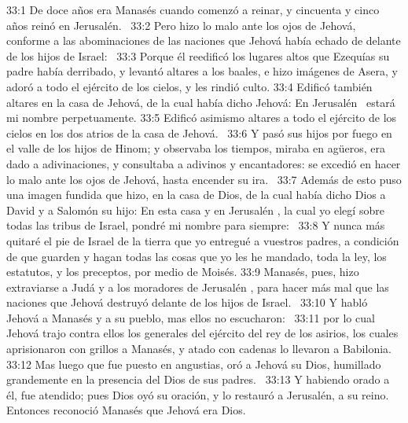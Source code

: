																																	
																																	33:1 De doce años era Manasés cuando comenzó a reinar, y cincuenta y cinco años reinó en Jerusalén.  
																																	33:2 Pero hizo lo malo ante los ojos de Jehová, conforme a las abominaciones de las naciones que Jehová había echado de delante de los hijos de Israel:  
																																	33:3 Porque él reedificó los lugares altos que Ezequías su padre había derribado, y levantó altares a los baales, e hizo imágenes de Asera, y adoró a todo el ejército de los cielos, y les rindió culto. 
																																	33:4 Edificó también altares en la casa de Jehová, de la cual había dicho Jehová: En Jerusalén  estará mi nombre perpetuamente. 
																																	33:5 Edificó asimismo altares a todo el ejército de los cielos en los dos atrios de la casa de Jehová.  
																																	33:6 Y pasó sus hijos por fuego en el valle de los hijos de Hinom; y observaba los tiempos, miraba en agüeros, era dado a adivinaciones, y consultaba a adivinos y encantadores: se excedió en hacer lo malo ante los ojos de Jehová, hasta encender su ira.  
																																	33:7 Además de esto puso una imagen fundida que hizo, en la casa de Dios, de la cual había dicho Dios a David y a Salomón su hijo: En esta casa y en Jerusalén , la cual yo elegí sobre todas las tribus de Israel, pondré mi nombre para siempre:  
																																	33:8 Y nunca más quitaré el pie de Israel de la tierra que yo entregué a vuestros padres, a condición de que guarden y hagan todas las cosas que yo les he mandado, toda la ley, los estatutos, y los preceptos, por medio de Moisés. 
																																	33:9 Manasés, pues, hizo extraviarse a Judá y a los moradores de Jerusalén , para hacer más mal que las naciones que Jehová destruyó delante de los hijos de Israel.  
																																	33:10 Y habló Jehová a Manasés y a su pueblo, mas ellos no escucharon:  
																																	33:11 por lo cual Jehová trajo contra ellos los generales del ejército del rey de los asirios, los cuales aprisionaron con grillos a Manasés, y atado con cadenas lo llevaron a Babilonia.  
																																	33:12 Mas luego que fue puesto en angustias, oró a Jehová su Dios, humillado grandemente en la presencia del Dios de sus padres.  
																																	33:13 Y habiendo orado a él, fue atendido; pues Dios oyó su oración, y lo restauró a Jerusalén, a su reino. Entonces reconoció Manasés que Jehová era Dios.  
